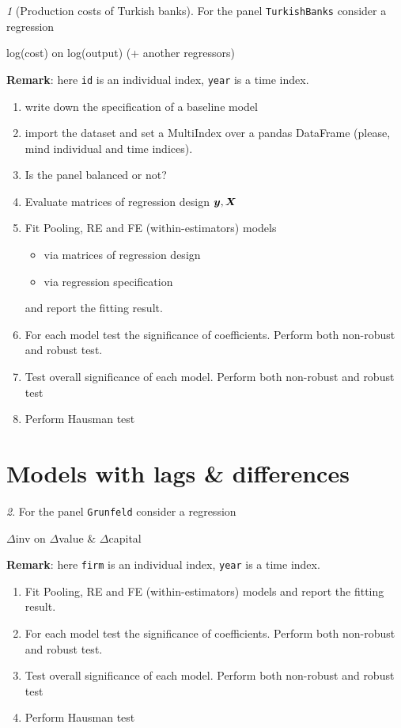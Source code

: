 \documentclass[12pt]{article}
\theoremstyle{remark}
\newtheorem{exercise}{}[section]
\begin{document}
\begin{exercise}[Production costs of Turkish banks]
For the panel \texttt{TurkishBanks} consider a regression
\begin{center}
	log(cost) on log(output) (+ another regressors)  
\end{center}
\textbf{Remark}: here \texttt{id} is an individual index, 
\texttt{year} is a time index.
\begin{enumerate}
	\item write down the specification of a baseline model
	\item import the dataset and set a MultiIndex over a pandas DataFrame 
	(please, mind  individual and time indices).
	\item Is the panel balanced or not?
	\item Evaluate matrices of regression design \({\bm y}, {\bm X}\)
	\item Fit Pooling, RE and FE (within-estimators) models
	\begin{itemize}
		\item via matrices of regression design
		\item via regression specification
	\end{itemize}
	and report the fitting result.
	\item For each model test the significance of coefficients. Perform both
	non-robust and robust test.
	\item Test overall significance of each model. Perform both
	non-robust and robust test
	\item Perform Hausman test
\end{enumerate}
\end{exercise}


\section{Models with lags \& differences}

\begin{exercise}
For the panel \texttt{Grunfeld} consider a regression
\begin{center}
	\(\Delta\)inv on \(\Delta\)value \& \(\Delta\)capital
\end{center}
\textbf{Remark}: here \texttt{firm} is an individual index, 
\texttt{year} is a time index.
\begin{enumerate}
	\item Fit Pooling, RE and FE (within-estimators) models
	and report the fitting result.
	\item For each model test the significance of coefficients. Perform both
	non-robust and robust test.
	\item Test overall significance of each model. Perform both
	non-robust and robust test
	\item Perform Hausman test
\end{enumerate}
\end{exercise}
\end{document}
